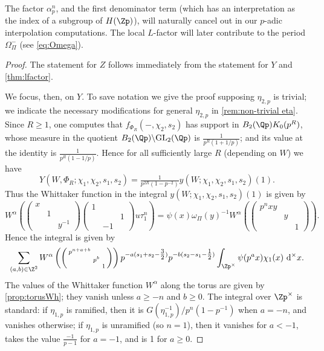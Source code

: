 \documentclass[10pt,reqno,a4paper]{amsart}
\newcommand{\sdthree}[3]{\left(\begin{smallmatrix}#1 \\ & #2\\ && #3\end{smallmatrix}\right)}
\newcommand{\GL}{\mathrm{GL}}
\newcommand{\smallthreemat}[9]{\left(\begin{smallmatrix}
#1 & #2 & #3 \\
#4 & #5 & #6 \\
#7 & #8 & #9\end{smallmatrix}\right)}
\begin{document}
The factor $\alpha_p^n$, and the first denominator term (which has an interpretation as the index of a subgroup of $H(\Zp)$), will naturally cancel out in our $p$-adic interpolation computations. The local $L$-factor will later contribute to the period $\Omega_\Pi^-$ (see \eqref{eq:Omega}).


\begin{proof}
The statement for $Z$ follows immediately from the statement for $Y$ and \cref{thm:lfactor}.

We focus, then, on $Y$. To save notation we give the proof supposing $\eta_{2, p}$ is trivial; we indicate the necessary modifications for general $\eta_{2,p}$ in \cref{rem:non-trivial eta}.
Since $R \ge 1$, one computes that $f_{\Phi_R}(-, \chi_2, s_2)$ has support in $B_2(\Qp) K_0(p^R)$, whose measure in the quotient $B_2(\Qp) \backslash \GL_2(\Qp)$ is $\tfrac{1}{p^R(1+1/p)}$; and its value at the identity is $\tfrac{1}{p^R(1-1/p)}$. Hence for all sufficiently large $R$ (depending on $W$) we have
\[ Y(W, \Phi_R; \chi_1, \chi_2, s_1, s_2) = \tfrac{1}{p^{2R}(1-p^{-2})} y(W; \chi_1, \chi_2, s_1, s_2)(1).\]
Thus the Whittaker function in the integral $y\left(W; \chi_1, \chi_2, s_1, s_2\right)(1)$ is given by
\[ W^{\alpha}\left(\sdthree{x}{1}{y^{-1}}\smallthreemat{1}{}{}{}{}{1}{}{-1}{}u \tau_{1}^n\right) =
\psi(x) \omega_\Pi(y)^{-1} W^{\alpha}
\left(\smallthreemat{p^n xy}{}{}{}{y}{}{}{}{1}\right).
\]
Hence the integral is given by
\[
\sum_{(a, b) \in \Z^2} W^{\alpha}\left(\sdthree{p^{n+a+b}}{p^b}{1}\right) p^{-a(s_1 + s_2 - \tfrac{3}{2})}  p^{-b(s_2 - s_1-\tfrac{1}{2})} \int_{\Zp^\times}\psi(p^a x) \chi_1(x) \ \mathrm{d}^\times x.
\]
The values of the Whittaker function $W^{\alpha}$ along the torus are given by \cref{prop:torusWh}; they vanish unless $a \geq -n$ and $b \geq 0$. The integral over $\Zp^\times$ is standard: if $\eta_{1,p}$ is ramified, then it is $G(\eta_{1,p}^{-1}) / p^n(1-p^{-1})$ when $a = -n$, and vanishes otherwise; if $\eta_{1,p}$ is unramified (so $n = 1$), then it vanishes for $a < -1$, takes the value $\tfrac{-1}{p-1}$ for $a = -1$, and is 1 for $a \ge 0$.


\end{proof}
\end{document}
